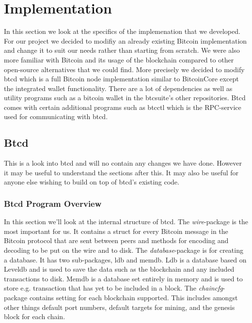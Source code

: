 \documentclass[12pt]{article}
\begin{document}
\section{Implementation}
In this section we look at the specifics of the implemenation that we developed. For our project we decided to modifiy an already existing Bitcoin implementation and change it to suit our needs rather than starting from scratch. We were also more familiar with Bitcoin and its usage of the blockchain compared to other open-source alternatives that we could find. More precisely we decided to modify btcd\cite{btcsuite2015} which is a full Bitcoin node implementation similar to BitcoinCore except the integrated wallet functionality. There are a lot of dependencies as well as utility programs such as a bitcoin wallet in the btcsuite's other repositories. Btcd comes with certain additional programs such as btcctl which is the RPC-service used for communicating with btcd. 


\subsection{Btcd}
This is a look into btcd and will no contain any changes we have done. However it may be useful to understand the sections after this. It may also be useful for anyone else wishing to build on top of btcd's existing code. 

\subsubsection{Btcd Program Overview}
In this section we'll look at the internal structure of btcd. The \emph{wire}-package is the most important for us. It contains a struct for every Bitcoin message in the Bitcoin protocol that are sent between peers and methods for encoding and decoding to be put on the wire and to disk. The \emph{database}-package is for creating a database. It has two sub-packages, ldb and memdb. Ldb is a database based on Leveldb and is used to save the data such as the blockchain and any included transactions to disk. Memdb is a database set entirely in memory and is used to store e.g. transaction that has yet to be included in a block. The \emph{chaincfg}-package contains setting for each blockchain supported. This includes amongst other things default port numbers, default targets for mining, and the genesis block for each chain.

\end{document}
